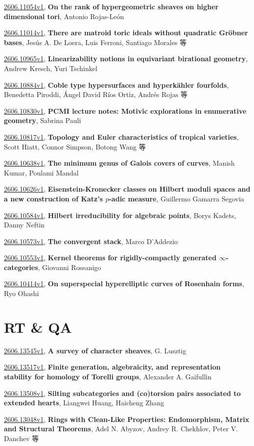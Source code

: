 \documentclass[9pt, a4paper]{article}
\theoremstyle{plain}
\theoremstyle{definition}
\theoremstyle{remark}
\newcommand{\arxiv}[3]{\href{https://arxiv.org/abs/#1}{#1}, \textbf{\textcolor{arxivblue}{#2}}, #3}
\begin{document}
\arxiv{2606.11054v1}{On the rank of hypergeometric sheaves on higher dimensional tori}{Antonio Rojas-León}

\arxiv{2606.11014v1}{There are matroid toric ideals without quadratic Gröbner bases}{Jesús A. De Loera, Luis Ferroni, Santiago Morales 等}

\arxiv{2606.10965v1}{Linearizability notions in equivariant birational geometry}{Andrew Kresch, Yuri Tschinkel}

\arxiv{2606.10884v1}{Coble type hypersurfaces and hyperkähler fourfolds}{Benedetta Piroddi, Ángel David Ríos Ortiz, Andrés Rojas 等}

\arxiv{2606.10830v1}{PCMI lecture notes: Motivic explorations in enumerative geometry}{Sabrina Pauli}

\arxiv{2606.10817v1}{Topology and Euler characteristics of tropical varieties}{Scott Hiatt, Connor Simpson, Botong Wang 等}

\arxiv{2606.10638v1}{The minimum genus of Galois covers of curves}{Manish Kumar, Poulami Mandal}

\arxiv{2606.10626v1}{Eisenstein-Kronecker classes on Hilbert moduli spaces and a new construction of Katz's $p$-adic measure}{Guillermo Gamarra Segovia}

\arxiv{2606.10584v1}{Hilbert irreducibility for algebraic points}{Borys Kadets, Danny Neftin}

\arxiv{2606.10573v1}{The convergent stack}{Marco D'Addezio}

\arxiv{2606.10553v1}{Kernel theorems for rigidly-compactly generated $\infty$-categories}{Giovanni Rossanigo}

\arxiv{2606.10414v1}{On superspecial hyperelliptic curves of Rosenhain forms}{Ryo Ohashi}


\section{RT \& QA}
\arxiv{2606.13545v1}{A survey of character sheaves}{G. Lusztig}

\arxiv{2606.13517v1}{Finite generation, algebraicity, and representation stability for homology of Torelli groups}{Alexander A. Gaifullin}

\arxiv{2606.13508v1}{Silting subcategories and (co)torsion pairs associated to extended hearts}{Liangwei Huang, Haicheng Zhang}

\arxiv{2606.13048v1}{Rings with Clean-Like Properties: Endomorphism, Matrix and Structural Theorems}{Adel N. Abyzov, Andrey R. Chekhlov, Peter V. Danchev 等}
\end{document}
